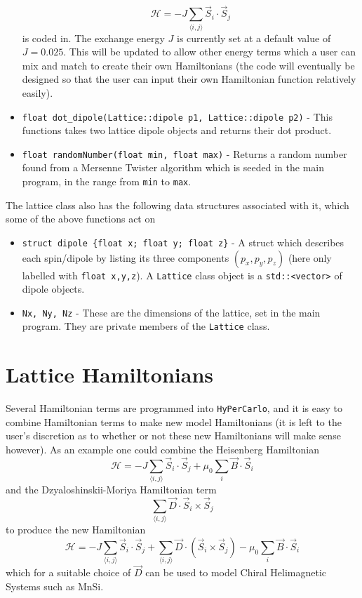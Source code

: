 \documentclass[aps,prb,twocolumn,showpacs,superscriptaddress,floatfix]{revtex4-1}
\begin{document}
\begin{itemize}
\begin{equation}
\mathcal{H} = -J\sum_{\langle i,j\rangle} \vec{S}_i \cdot \vec{S}_j
\end{equation}
is coded in. The exchange energy $J$ is currently set at a default value of $J=0.025$. This will be updated to allow other energy terms which a user can mix and match to create their own Hamiltonians (the code will eventually be designed so that the user can input their own Hamiltonian function relatively easily).
\item {\tt float dot\_dipole(Lattice::dipole p1, Lattice::dipole p2)} - This functions takes two lattice dipole objects and returns their dot product.
\item {\tt float randomNumber(float min, float max)} - Returns a random number found from a Mersenne Twister algorithm which is seeded in the main program, in the range from {\tt min} to {\tt max}.
\end{itemize}

The lattice class also has the following data structures associated with it, which some of the above functions act on
\begin{itemize}
\item {\tt struct dipole \{float x; float y; float z\}} - A struct which describes each spin/dipole by listing its three components $(p_x,p_y,p_z)$ (here only labelled with {\tt float x,y,z}). A {\tt Lattice} class object is a {\tt  std::<vector>} of dipole objects.
\item {\tt Nx, Ny, Nz} - These are the dimensions of the lattice, set in the main program. They are private members of the {\tt Lattice} class.
\end{itemize}

\section{Lattice Hamiltonians}
Several Hamiltonian terms are programmed into {\tt HyPerCarlo}, and it is easy to combine Hamiltonian terms to make new model Hamiltonians (it is left to the user's discretion as to whether or not these new Hamiltonians will make sense however). As an example one could combine the Heisenberg Hamiltonian
\begin{equation}
\mathcal{H} = -J\sum_{\langle i,j\rangle} \vec{S}_i \cdot \vec{S}_j +  \mu_0\sum_i\vec{B}\cdot\vec{S}_i
\end{equation}
and the Dzyaloshinskii-Moriya Hamiltonian term 
\begin{equation}
\sum_{\langle i,j \rangle} \vec{D}\cdot\vec{S}_i \times \vec{S}_j
\end{equation}
to produce the new Hamiltonian
\begin{equation}
\mathcal{H} = -J\sum_{\langle i,j\rangle} \vec{S}_i \cdot \vec{S}_j + \sum_{\langle i,j \rangle} \vec{D}\cdot (\vec{S}_i \times \vec{S}_j) - \mu_0\sum_i\vec{B}\cdot\vec{S}_i
\end{equation}
which for a suitable choice of $\vec{D}$ can be used to model Chiral Helimagnetic Systems such as MnSi.
\end{document}
